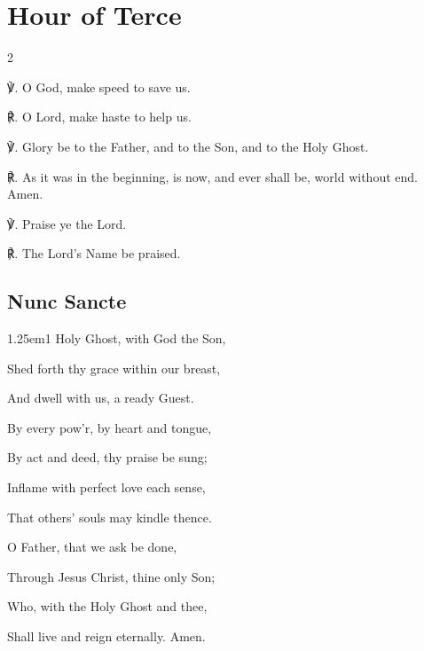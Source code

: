 \fancyhead[RE,LO]{}
\section{Hour of Terce}


\begin{multicols}{2}

℣. O God, {} make speed to save us.

℟. O Lord, make haste to help us.

℣. Glory be to the Father, and to the Son, and to the Holy Ghost.

℟. As it was in the beginning, is now, and ever shall be, world without end. Amen.

℣. Praise ye the Lord.

℟. The Lord's Name be praised.


\subsection{Nunc Sancte}

\begin{hangparas}{1.25em}{1}
 Holy Ghost, with God the Son,\par
{}\par\noindent
Shed forth thy grace within our breast,\par\noindent
And dwell with us, a ready Guest.\\
\par\noindent
By every pow'r, by heart and tongue,\par\noindent
By act and deed, thy praise be sung;\par\noindent
Inflame with perfect love each sense,\par\noindent
That others' souls may kindle thence.\\
\par\noindent
O Father, that we ask be done,\par\noindent
Through Jesus Christ, thine only Son;\par\noindent
Who, with the Holy Ghost and thee,\par\noindent
Shall live and reign eternally. Amen.\\
\end{hangparas}



\end{multicols}
